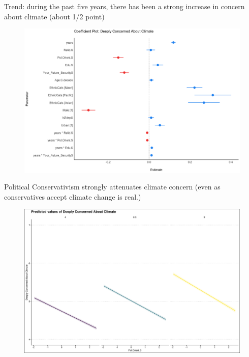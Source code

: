 \documentclass{beamer}
\begin{document}
\begin{frame}{Trend: during the past five years, there has been a strong increase in concern about climate (about 1/2 point)}
\begin{figure}
\includegraphics[width=.8\textwidth,height=\textheight,keepaspectratio]{Figures/CONCERN_TIME.png}
\end{figure}
\end{frame}
% 
% 
% 
% 


\begin{frame}{Political Conservativism strongly attenuates climate concern (even as conservatives accept climate change is real.)}
\begin{figure}
\includegraphics[width=.8\textwidth,height=\textheight,keepaspectratio]{Figures/CONCERN_Pol.Orient.S.png}
\end{figure}
\end{frame}
\end{document}
